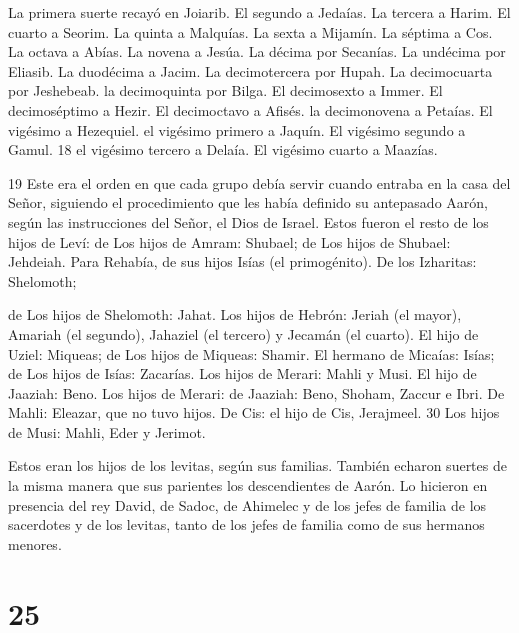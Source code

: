  La primera suerte recayó en Joiarib. El segundo a Jedaías.
 La tercera a Harim. El cuarto a Seorim.  La
quinta a Malquías. La sexta a Mijamín.  La séptima a Cos.
La octava a Abías.  La novena a Jesúa. La décima por
Secanías.  La undécima por Eliasib. La duodécima a Jacim.
 La decimotercera por Hupah. La decimocuarta por Jeshebeab.
 la decimoquinta por Bilga. El decimosexto a Immer.
 El decimoséptimo a Hezir. El decimoctavo a Afisés.
 la decimonovena a Petaías. El vigésimo a Hezequiel.
 el vigésimo primero a Jaquín. El vigésimo segundo a Gamul.
18 el vigésimo tercero a Delaía. El vigésimo cuarto a Maazías.

19 Este era el orden en que cada grupo debía servir cuando entraba en la
casa del Señor, siguiendo el procedimiento que les había definido su
antepasado Aarón, según las instrucciones del Señor, el Dios de Israel.
 Estos fueron el resto de los hijos de Leví: de Los hijos
de Amram: Shubael; de Los hijos de Shubael: Jehdeiah.  Para
Rehabía, de sus hijos Isías (el primogénito).  De los
Izharitas: Shelomoth;

de Los hijos de Shelomoth: Jahat.  Los hijos de Hebrón:
Jeriah (el mayor), Amariah (el segundo), Jahaziel (el tercero) y Jecamán
(el cuarto).  El hijo de Uziel: Miqueas; de Los hijos de
Miqueas: Shamir.  El hermano de Micaías: Isías; de Los
hijos de Isías: Zacarías.  Los hijos de Merari: Mahli y
Musi. El hijo de Jaaziah: Beno.  Los hijos de Merari: de
Jaaziah: Beno, Shoham, Zaccur e Ibri.  De Mahli: Eleazar,
que no tuvo hijos.  De Cis: el hijo de Cis, Jerajmeel. 30
Los hijos de Musi: Mahli, Eder y Jerimot.

Estos eran los hijos de los levitas, según sus familias. 
También echaron suertes de la misma manera que sus parientes los
descendientes de Aarón. Lo hicieron en presencia del rey David, de
Sadoc, de Ahimelec y de los jefes de familia de los sacerdotes y de los
levitas, tanto de los jefes de familia como de sus hermanos menores.

\hypertarget{section-24}{%
\section{25}\label{section-24}}

